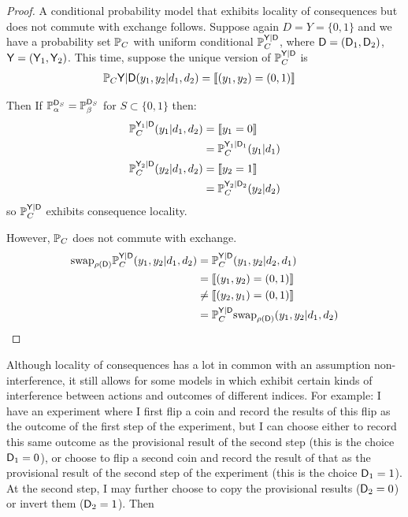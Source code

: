 \begin{proof}
A conditional probability model that exhibits locality of consequences but does not commute with exchange follows. Suppose again $D=Y=\{0,1\}$ and we have a probability set $\mathbb{P}_C$ with uniform conditional $\mathbb{P}_C^{\mathsf{Y}|\mathsf{D}}$, where $\mathsf{D}=(\mathsf{D}_1,\mathsf{D}_2)$, $\mathsf{Y}=(\mathsf{Y}_1,\mathsf{Y}_2)$. This time, suppose the unique version of $\mathbb{P}_C^{\mathsf{Y}|\mathsf{D}}$ is
\begin{align}
    \mathbb{P}_C{\mathsf{Y}|\mathsf{D}}(y_1,y_2|d_1,d_2) &= \llbracket (y_1,y_2)= (0,1) \rrbracket
\end{align}

Then  If $\mathbb{P}_\alpha^{\mathsf{D}_S}=\mathbb{P}_\beta^{\mathsf{D}_S}$ for $S\subset\{0,1\}$ then:
\begin{align}
    \mathbb{P}_C^{\mathsf{Y}_1|\mathsf{D}}(y_1|d_1,d_2) &= \llbracket y_1= 0 \rrbracket\\
    &= \mathbb{P}_C^{\mathsf{Y}_1|\mathsf{D}_1}(y_1|d_1)\\
    \mathbb{P}_C^{\mathsf{Y}_2|\mathsf{D}}(y_2|d_1,d_2)&= \llbracket y_2= 1 \rrbracket\\
    &= \mathbb{P}_C^{\mathsf{Y}_2|\mathsf{D}_2}(y_2|d_2)
\end{align}
so $\mathbb{P}_C^{\mathsf{Y}|\mathsf{D}}$ exhibits consequence locality.

However, $\mathbb{P}_C$ does not commute with exchange.
\begin{align}
    \text{swap}_{\rho(\mathsf{D})} \mathbb{P}_C^{\mathsf{Y}|\mathsf{D}}(y_1,y_2|d_1,d_2) &= \mathbb{P}_C^{\mathsf{Y}|\mathsf{D}}(y_1,y_2|d_2,d_1)\\
    &=\llbracket (y_1,y_2)= (0,1) \rrbracket\\
    &\neq \llbracket (y_2,y_1)= (0,1) \rrbracket\\
    &= \mathbb{P}_C^{\mathsf{Y}|\mathsf{D}}\text{swap}_{\rho(\mathsf{D})}(y_1,y_2|d_1,d_2)
\end{align}
\end{proof}

Although locality of consequences has a lot in common with an assumption non-interference, it still allows for some models in which exhibit certain kinds of interference between actions and outcomes of different indices. For example: I have an experiment where I first flip a coin and record the results of this flip as the outcome of the first step of the experiment, but I can choose either to record this same outcome as the provisional result of the second step (this is the choice $\mathsf{D}_1=0$), or choose to flip a second coin and record the result of that as the provisional result of the second step of the experiment (this is the choice $\mathsf{D}_1=1$). At the second step, I may further choose to copy the provisional results ($\mathsf{D}_2=0$) or invert them ($\mathsf{D}_2=1$). Then

